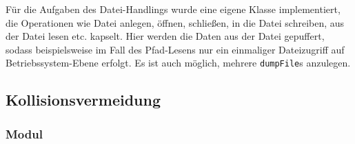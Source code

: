 Für die Aufgaben des Datei-Handlings wurde eine eigene Klasse implementiert, die Operationen wie Datei anlegen, öffnen, schließen, in die Datei schreiben, aus der Datei lesen etc. kapselt.
Hier werden die Daten aus der Datei gepuffert, sodass beispielsweise im Fall des Pfad-Lesens nur ein einmaliger Dateizugriff auf Betriebssystem-Ebene erfolgt.
Es ist auch möglich, mehrere \lstinline{dumpFile}s anzulegen.


% 
% 



\subsection{Kollisionsvermeidung}
\label{kollisionsvermeidung_subsec}

\subsubsection{Modul}
\authorsection{\editortobias}

